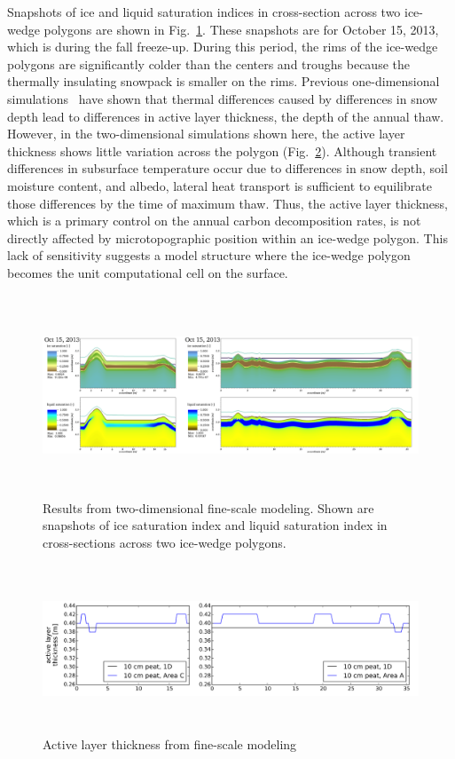 \documentclass[review]{elsarticle}
\begin{document}
Snapshots of ice and liquid saturation indices in cross-section across two ice-wedge polygons are shown in Fig.~\ref{oct15}. These snapshots are for October 15, 2013, which is during the fall freeze-up. During this period, the rims of the ice-wedge polygons are significantly colder than the centers and troughs because the thermally insulating snowpack is smaller on the rims. Previous one-dimensional simulations~\cite{atchley2016} have shown that thermal differences caused by differences in snow depth lead to differences in active layer thickness, the depth of the annual thaw. However, in the two-dimensional simulations shown here, the active layer thickness shows little variation across the polygon (Fig.~\ref{alt}). Although transient differences in subsurface temperature occur due to differences in snow depth, soil moisture content, and albedo, lateral heat transport is sufficient to equilibrate those differences by the time of maximum thaw. Thus, the active layer thickness, which is a primary control on the annual carbon decomposition rates, is not directly affected by microtopographic position within an ice-wedge polygon. This lack of sensitivity suggests a model structure where the ice-wedge polygon becomes the unit computational cell on the surface. 

\begin{figure}[!htpb]
\centering
\includegraphics[height=6cm,width=15cm]{figures/FineScaleOct15.png}
\caption{Results from two-dimensional fine-scale modeling. Shown are snapshots of ice saturation index and liquid saturation index in cross-sections across two ice-wedge polygons.}
\label{oct15}
\end{figure}

\begin{figure}[!htpb]
\centering
\includegraphics[height=5cm, width=12cm]{figures/ALT-finescale.png}
\caption{Active layer thickness from fine-scale modeling}
\label{alt}
\end{figure}
\end{document}
